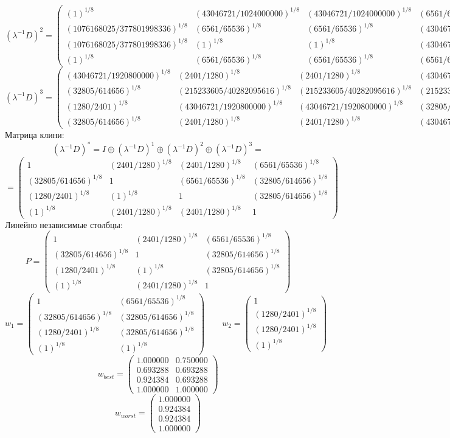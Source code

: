 $$(\lambda^{-1}D)^2 = \begin{pmatrix}
(1)^{1/8} & (43046721/1024000000)^{1/8} & (43046721/1024000000)^{1/8} & (6561/65536)^{1/8}\\
(1076168025/377801998336)^{1/8} & (6561/65536)^{1/8} & (6561/65536)^{1/8} & (43046721/377801998336)^{1/8}\\
(1076168025/377801998336)^{1/8} & (1)^{1/8} & (1)^{1/8} & (43046721/3603000625)^{1/8}\\
(1)^{1/8} & (6561/65536)^{1/8} & (6561/65536)^{1/8} & (6561/65536)^{1/8}
\end{pmatrix}
$$
$$(\lambda^{-1}D)^3 = \begin{pmatrix}
(43046721/1920800000)^{1/8} & (2401/1280)^{1/8} & (2401/1280)^{1/8} & (43046721/1920800000)^{1/8}\\
(32805/614656)^{1/8} & (215233605/40282095616)^{1/8} & (215233605/40282095616)^{1/8} & (215233605/40282095616)^{1/8}\\
(1280/2401)^{1/8} & (43046721/1920800000)^{1/8} & (43046721/1920800000)^{1/8} & (32805/614656)^{1/8}\\
(32805/614656)^{1/8} & (2401/1280)^{1/8} & (2401/1280)^{1/8} & (43046721/1920800000)^{1/8}
\end{pmatrix}
$$
Матрица клини:
$$(\lambda^{-1}D)^* = I \oplus (\lambda^{-1}D)^1 \oplus (\lambda^{-1}D)^2 \oplus (\lambda^{-1}D)^3 = $$
$$ = \begin{pmatrix}
1 & (2401/1280)^{1/8} & (2401/1280)^{1/8} & (6561/65536)^{1/8}\\
(32805/614656)^{1/8} & 1 & (6561/65536)^{1/8} & (32805/614656)^{1/8}\\
(1280/2401)^{1/8} & (1)^{1/8} & 1 & (32805/614656)^{1/8}\\
(1)^{1/8} & (2401/1280)^{1/8} & (2401/1280)^{1/8} & 1
\end{pmatrix}
$$
Линейно независимые столбцы:
$$P = \begin{pmatrix}
1 & (2401/1280)^{1/8} & (6561/65536)^{1/8}\\
(32805/614656)^{1/8} & 1 & (32805/614656)^{1/8}\\
(1280/2401)^{1/8} & (1)^{1/8} & (32805/614656)^{1/8}\\
(1)^{1/8} & (2401/1280)^{1/8} & 1
\end{pmatrix}
$$
$$w_1 = \begin{pmatrix}
1 & (6561/65536)^{1/8}\\
(32805/614656)^{1/8} & (32805/614656)^{1/8}\\
(1280/2401)^{1/8} & (32805/614656)^{1/8}\\
(1)^{1/8} & (1)^{1/8}
\end{pmatrix}
\qquad w_2 = \begin{pmatrix}
1\\
(1280/2401)^{1/8}\\
(1280/2401)^{1/8}\\
(1)^{1/8}
\end{pmatrix}
$$
$$w_{best} = \begin{pmatrix}
1.000000 & 0.750000\\
0.693288 & 0.693288\\
0.924384 & 0.693288\\
1.000000 & 1.000000
\end{pmatrix}
$$
$$w_{worst} = \begin{pmatrix}
1.000000\\
0.924384\\
0.924384\\
1.000000
\end{pmatrix}
$$
